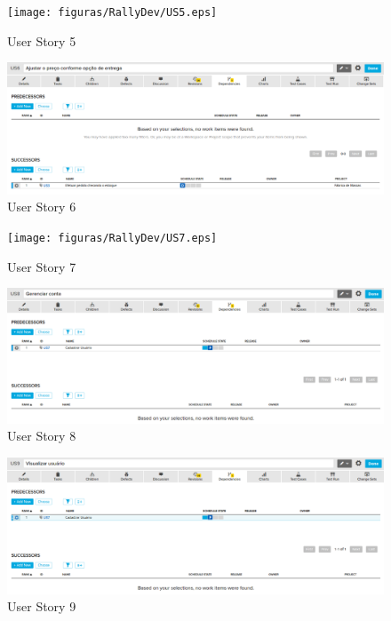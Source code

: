 \begin{figure}[h]
    \centering
    \label{fig01}
        \texttt{[image: figuras/RallyDev/US5.eps]}
    \caption{User Story 5}
\end{figure}

\begin{figure}[h]
    \centering
    \label{fig01}
        \includegraphics[keepaspectratio=true,scale=0.3]{figuras/RallyDev/US6.eps}
    \caption{User Story 6}
\end{figure}

\begin{figure}[h]
    \centering
    \label{fig01}
        \texttt{[image: figuras/RallyDev/US7.eps]}
    \caption{User Story 7}
\end{figure}

\begin{figure}[h]
    \centering
    \label{fig01}
        \includegraphics[keepaspectratio=true,scale=0.3]{figuras/RallyDev/US8.eps}
    \caption{User Story 8}
\end{figure}

\begin{figure}[h]
    \centering
    \label{fig01}
        \includegraphics[keepaspectratio=true,scale=0.3]{figuras/RallyDev/US9.eps}
    \caption{User Story 9}
\end{figure}

